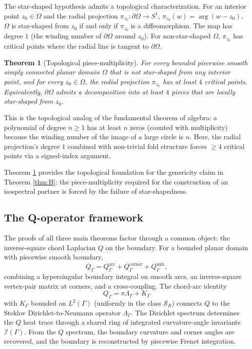 \documentclass[11pt,reqno]{amsart}
\theoremstyle{plain}
\newtheorem{theorem}{Theorem}[section]
\theoremstyle{definition}
\theoremstyle{remark}
\newcommand{\Scal}{\mathcal{S}}
\newcommand{\Qop}{Q}
\newcommand{\Lambdaop}{\Lambda}
\newcommand{\Icalbb}{\mathcal{I}}
\begin{document}
The star-shaped hypothesis admits a topological characterization. For an interior point $z_0 \in \Omega$ and the radial projection $\pi_{z_0} \colon \partial\Omega \to S^1$, $\pi_{z_0}(w) = \arg(w - z_0)$, $\Omega$ is star-shaped from $z_0$ if and only if $\pi_{z_0}$ is a diffeomorphism. The map has degree $1$ (the winding number of $\partial\Omega$ around $z_0$). For non-star-shaped $\Omega$, $\pi_{z_0}$ has critical points where the radial line is tangent to $\partial\Omega$.

\begin{theorem}[Topological piece-multiplicity]\label{thm:topological}
For every bounded piecewise smooth simply connected planar domain $\Omega$ that is not star-shaped from any interior point, and for every $z_0 \in \Omega$, the radial projection $\pi_{z_0}$ has at least $4$ critical points. Equivalently, $\partial\Omega$ admits a decomposition into at least $4$ pieces that are locally star-shaped from $z_0$.
\end{theorem}

This is the topological analog of the fundamental theorem of algebra: a polynomial of degree $n \geq 1$ has at least $n$ zeros (counted with multiplicity) because the winding number of the image of a large circle is $n$. Here, the radial projection's degree $1$ combined with non-trivial fold structure forces $\geq 4$ critical points via a signed-index argument.

Theorem \ref{thm:topological} provides the topological foundation for the genericity claim in Theorem \ref{thm:B}: the piece-multiplicity required for the construction of an isospectral partner is forced by the failure of star-shapedness.

\subsection{The Q-operator framework}\label{ss:Q-framework}

The proofs of all three main theorems factor through a common object: the inverse-square chord Laplacian $\Qop$ on the boundary. For a bounded planar domain with piecewise smooth boundary,
\[
\Qop_\Gamma = \Qop_\Gamma^{\mathrm{arc}} + \Qop_\Gamma^{\mathrm{corner}} + \Qop_\Gamma^{\mathrm{mix}},
\]
combining a hypersingular boundary integral on smooth arcs, an inverse-square vertex-pair matrix at corners, and a cross-coupling. The chord-arc identity
\[
\Qop_\Gamma = \pi\Lambdaop_\Gamma + K_\Gamma
\]
with $K_\Gamma$ bounded on $L^2(\Gamma)$ (uniformly in the class $\Scal_R$) connects $\Qop$ to the Steklov Dirichlet-to-Neumann operator $\Lambdaop_\Gamma$. The Dirichlet spectrum determines the $\Qop$ heat trace through a shared ring of integrated curvature-angle invariants $\Icalbb(\Gamma)$. From the $\Qop$ spectrum, the boundary curvature and corner angles are recovered, and the boundary is reconstructed by piecewise Frenet integration.
\end{document}
